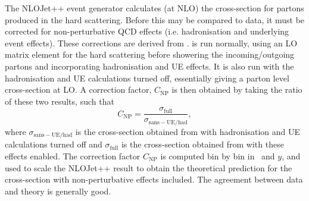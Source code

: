 The NLOJet++ event generator calculates (at NLO) the cross-section for partons produced in the hard scattering. Before this may be compared to data, it must be corrected for non-perturbative QCD effects (i.e. hadronisation and underlying event effects). These corrections are derived from \pythia. \pythia is run normally, using an LO matrix element for the hard scattering before showering the incoming/outgoing partons and incorporating hadronisation and UE effects. It is also run with the hadronisation and UE calculations turned off, essentially giving a parton level cross-section at LO. A correction factor, $C_\mathrm{NP}$ is then obtained by taking the ratio of these two results, such that
\begin{equation}
C_\mathrm{NP} = \frac{\sigma_\mathrm{full}}{\sigma_\mathrm{sans-UE/had}},
\end{equation}
where $\sigma_\mathrm{sans-UE/had}$ is the cross-section obtained from \pythia with hadronisation and UE calculations turned off and $\sigma_\mathrm{full}$ is the cross-section obtained from \pythia with these effects enabled. The correction factor $C_\mathrm{NP}$ is computed bin by bin in \pt~and $y$, and used to scale the NLOJet++ result to obtain the theoretical prediction for the cross-section with non-perturbative effects included. The agreement between data and theory is generally good.






%
%
%
%
%
%
%
%




